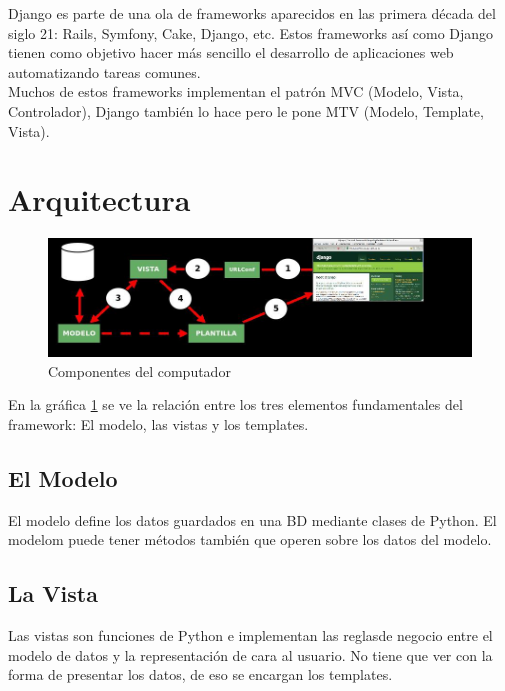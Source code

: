 Django es parte de una ola de frameworks aparecidos en las primera década del siglo 21: Rails, Symfony, Cake, Django, etc. Estos frameworks así como Django tienen como objetivo hacer más sencillo el desarrollo de aplicaciones web automatizando tareas comunes.\\

Muchos de estos frameworks implementan el patrón MVC (Modelo, Vista, Controlador), Django también lo hace pero le pone MTV (Modelo, Template, Vista).\\

\section{Arquitectura}

\begin{figure}[ht!]
   \centering
   \includegraphics[scale=0.5]{imagenes/arquitectura_django.jpg}
   \caption{Componentes del computador}\label{graf:arquitectura-django}
\end{figure}

En la gráfica \ref{graf:arquitectura-django} \cite{Infante2012} se ve la relación entre los tres elementos fundamentales del framework: El modelo, las vistas y los templates.\\

\subsection*{El Modelo}

El modelo define los datos guardados en una BD mediante clases de Python. El modelom puede tener métodos también que operen sobre los datos del modelo.

\subsection*{La Vista}

Las vistas son funciones de Python e implementan las reglasde negocio entre el modelo de datos y la representación de cara al usuario. No tiene que ver con la forma de presentar los datos, de eso se encargan los templates.

